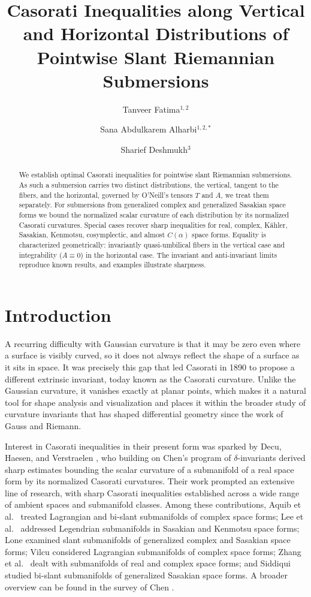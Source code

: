 \documentclass[11pt]{amsart}
\title[Casorati Inequalities for Pointwise Slant Submersions]{Casorati Inequalities along Vertical and Horizontal Distributions of Pointwise Slant Riemannian Submersions}
\author{Tanveer Fatima$^{1,2}$}
\author{Sana Abdulkarem Alharbi$^{1,2,*}$}
\author{Sharief Deshmukh$^{3}$}
\theoremstyle{plain}
\theoremstyle{definition}
\theoremstyle{remark}
\begin{document}
\begin{abstract}
We establish optimal Casorati inequalities for pointwise slant Riemannian
submersions. As such a submersion carries two distinct distributions, the
vertical, tangent to the fibers, and the horizontal, governed by O'Neill's
tensors $T$ and $A$, we treat them separately. For submersions from generalized
complex and generalized Sasakian space forms we bound the normalized scalar
curvature of each distribution by its normalized Casorati curvatures. Special cases recover sharp
inequalities for real, complex, K\"ahler, Sasakian, Kenmotsu, cosymplectic, and
almost $C(\alpha)$ space forms. Equality is characterized geometrically:
invariantly quasi-umbilical fibers in the vertical case and integrability
($A\equiv 0$) in the horizontal case. The invariant and anti-invariant limits
reproduce known results, and examples illustrate sharpness.
\end{abstract}

\maketitle

\section{Introduction}
A recurring difficulty with Gaussian curvature is that it may be zero even where
a surface is visibly curved, so it does not always reflect the shape of a
surface as it sits in space. It was precisely this gap that led Casorati
\cite{Casorati1890} in 1890 to propose a different extrinsic invariant, today
known as the Casorati curvature. Unlike the Gaussian curvature, it vanishes
exactly at planar points, which makes it a natural tool for shape analysis and
visualization \cite{Decu2008, Ons2011} and places it within the broader study of
curvature invariants that has shaped differential geometry since the work of
Gauss and Riemann.

Interest in Casorati inequalities in their present form was sparked by Decu,
Haesen, and Verstraelen \cite{Decu2008}, who building on Chen's program of
$\delta$-invariants \cite{Chen1990, Chen2011} derived sharp estimates bounding
the scalar curvature of a submanifold of a real space form by its normalized
Casorati curvatures. Their work prompted an extensive line of research, with sharp Casorati
inequalities established across a wide range of ambient spaces and submanifold
classes. Among these contributions, Aquib et al.\ \cite{Aquib2019, Aquib2018}
treated Lagrangian and bi-slant submanifolds of complex space forms; Lee et al.\
\cite{Lee2020a, Lee2022, Lee2017} addressed Legendrian submanifolds in Sasakian
and Kenmotsu space forms; Lone \cite{Lone2017a, Lone2017b, Lone2019, Lone2019a}
examined slant submanifolds of generalized complex and Sasakian space forms;
Vilcu \cite{Vilcu2018} considered Lagrangian submanifolds of complex space
forms; Zhang et al.\ \cite{Zhang2016, Zhang2016a} dealt with submanifolds of
real and complex space forms; and Siddiqui \cite{Siddiqui2018} studied bi-slant
submanifolds of generalized Sasakian space forms. A broader overview can be
found in the survey of Chen \cite{Chen2021}.
\end{document}
